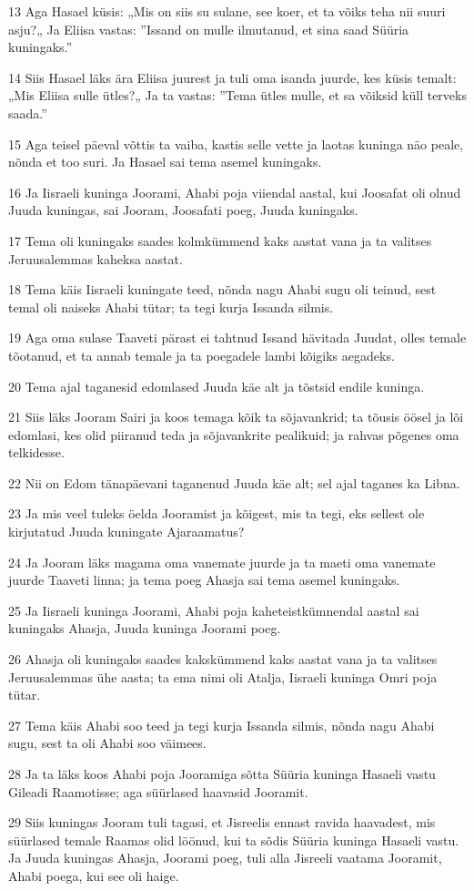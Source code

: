 \par 13 Aga Hasael küsis: „Mis on siis su sulane, see koer, et ta võiks teha nii suuri asju?„ Ja Eliisa vastas: ”Issand on mulle ilmutanud, et sina saad Süüria kuningaks.”
\par 14 Siis Hasael läks ära Eliisa juurest ja tuli oma isanda juurde, kes küsis temalt: „Mis Eliisa sulle ütles?„ Ja ta vastas: ”Tema ütles mulle, et sa võiksid küll terveks saada.”
\par 15 Aga teisel päeval võttis ta vaiba, kastis selle vette ja laotas kuninga näo peale, nõnda et too suri. Ja Hasael sai tema asemel kuningaks.
\par 16 Ja Iisraeli kuninga Joorami, Ahabi poja viiendal aastal, kui Joosafat oli olnud Juuda kuningas, sai Jooram, Joosafati poeg, Juuda kuningaks.
\par 17 Tema oli kuningaks saades kolmkümmend kaks aastat vana ja ta valitses Jeruusalemmas kaheksa aastat.
\par 18 Tema käis Iisraeli kuningate teed, nõnda nagu Ahabi sugu oli teinud, sest temal oli naiseks Ahabi tütar; ta tegi kurja Issanda silmis.
\par 19 Aga oma sulase Taaveti pärast ei tahtnud Issand hävitada Juudat, olles temale tõotanud, et ta annab temale ja ta poegadele lambi kõigiks aegadeks.
\par 20 Tema ajal taganesid edomlased Juuda käe alt ja tõstsid endile kuninga.
\par 21 Siis läks Jooram Sairi ja koos temaga kõik ta sõjavankrid; ta tõusis öösel ja lõi edomlasi, kes olid piiranud teda ja sõjavankrite pealikuid; ja rahvas põgenes oma telkidesse.
\par 22 Nii on Edom tänapäevani taganenud Juuda käe alt; sel ajal taganes ka Libna.
\par 23 Ja mis veel tuleks öelda Jooramist ja kõigest, mis ta tegi, eks sellest ole kirjutatud Juuda kuningate Ajaraamatus?
\par 24 Ja Jooram läks magama oma vanemate juurde ja ta maeti oma vanemate juurde Taaveti linna; ja tema poeg Ahasja sai tema asemel kuningaks.
\par 25 Ja Iisraeli kuninga Joorami, Ahabi poja kaheteistkümnendal aastal sai kuningaks Ahasja, Juuda kuninga Joorami poeg.
\par 26 Ahasja oli kuningaks saades kakskümmend kaks aastat vana ja ta valitses Jeruusalemmas ühe aasta; ta ema nimi oli Atalja, Iisraeli kuninga Omri poja tütar.
\par 27 Tema käis Ahabi soo teed ja tegi kurja Issanda silmis, nõnda nagu Ahabi sugu, sest ta oli Ahabi soo väimees.
\par 28 Ja ta läks koos Ahabi poja Jooramiga sõtta Süüria kuninga Hasaeli vastu Gileadi Raamotisse; aga süürlased haavasid Jooramit.
\par 29 Siis kuningas Jooram tuli tagasi, et Jisreelis ennast ravida haavadest, mis süürlased temale Raamas olid löönud, kui ta sõdis Süüria kuninga Hasaeli vastu. Ja Juuda kuningas Ahasja, Joorami poeg, tuli alla Jisreeli vaatama Jooramit, Ahabi poega, kui see oli haige.

